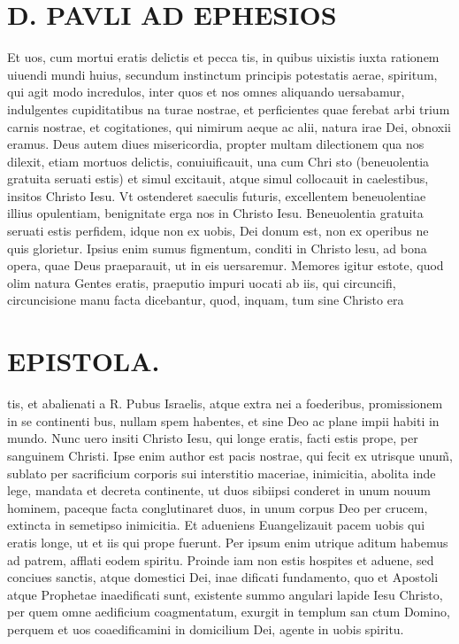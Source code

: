 \documentclass{article}
\begin{document}
\begin{pages}
\section*{D. PAVLI AD EPHESIOS }
\marginpar{[ p.1. ]}
\marginpar{[ p.2. ]}
\marginpar{[ p.3. ]}
\marginpar{[ p.4. ]}\pstart Et uos, cum mortui eratis delictis et pecca tis, in quibus uixistis iuxta rationem uiuendi mundi huius, secundum instinctum principis potestatis aerae, spiritum, qui agit modo incredulos, inter quos et nos omnes aliquando uersabamur, indulgentes cupiditatibus na turae nostrae, et perficientes quae ferebat arbi trium carnis nostrae, et cogitationes, qui nimirum aeque ac alii, natura irae Dei, obnoxii eramus.  \pend\pstart Deus autem diues misericordia, propter multam dilectionem qua nos dilexit, etiam mortuos delictis, conuiuificauit, una cum Chri sto (beneuolentia gratuita seruati estis) et simul excitauit, atque  simul collocauit in caelestibus, insitos Christo Iesu. Vt ostenderet saeculis futuris, excellentem beneuolentiae illius opulentiam, benignitate erga nos in Christo Iesu.  \pend\pstart Beneuolentia gratuita seruati estis perfidem, idque  non ex uobis, Dei donum est, non ex operibus ne quis glorietur. Ipsius enim sumus figmentum, conditi in Christo lesu, ad bona opera, quae Deus praeparauit, ut in eis uersaremur.  \pend\pstart Memores igitur estote, quod olim natura Gentes eratis, praeputio impuri uocati ab iis, qui circuncifi, circuncisione manu facta dicebantur, quod, inquam, tum sine Christo era\pend
\section*{EPISTOLA.  }
\marginpar{[ p.11 ]}
\marginpar{[ p.5. ]}
\marginpar{[ p.6. ]}
\marginpar{[ p.7. ]}\pstart tis, et abalienati a R. Pubus  Israelis, atque  extra nei a foederibus, promissionem in se continenti bus, nullam spem habentes, et sine Deo ac plane impii habiti in mundo.  \pend\pstart Nunc uero insiti Christo Iesu, qui longe eratis, facti estis prope, per sanguinem Christi. Ipse enim author est pacis nostrae, qui fecit ex utrisque  unum̃, sublato per sacrificium corporis sui interstitio maceriae, inimicitia, abolita inde lege, mandata et decreta continente, ut duos sibiipsi conderet in unum nouum hominem, paceque  facta conglutinaret duos, in unum corpus Deo per crucem, extincta in semetipso inimicitia.  \pend\pstart Et adueniens Euangelizauit pacem uobis qui eratis longe, ut et iis qui prope fuerunt. Per ipsum enim utrique aditum habemus ad patrem, afflati eodem spiritu.  \pend\pstart Proinde iam non estis hospites et aduene, sed conciues sanctis, atque domestici Dei, inae dificati fundamento, quo et Apostoli atque Prophetae inaedificati sunt, existente summo angulari lapide Iesu Christo, per quem omne aedificium coagmentatum, exurgit in templum san ctum Domino, perquem et uos coaedificamini in domicilium Dei, agente in uobis spiritu.  \pend

\end{pages}
\end{document}
